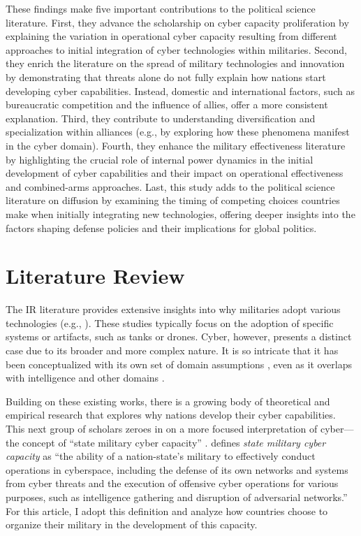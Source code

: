 \documentclass[12pt, letterpaper]{article}
\theoremstyle{plain}
\theoremstyle{remark}
\begin{document}
These findings make five important contributions to the political science literature.
First, they advance the scholarship on cyber capacity proliferation %
by explaining the variation in operational cyber capacity resulting from different approaches to initial integration of cyber technologies within militaries. 
Second, they enrich the literature on the spread of military technologies and innovation by demonstrating that threats alone do not fully explain how nations start developing cyber capabilities. Instead, domestic and international factors, such as bureaucratic competition and the influence of allies, offer a more consistent explanation.
Third, they contribute to understanding diversification and specialization within alliances (e.g., by exploring how these phenomena manifest in the cyber domain).
Fourth, they enhance the military effectiveness literature by highlighting the crucial role of internal power dynamics in the initial development of cyber capabilities and their impact on operational effectiveness and combined-arms approaches.
Last, this study adds to the political science literature on diffusion by examining the timing of competing choices countries make when initially integrating new technologies, offering deeper insights into the factors shaping defense policies and their implications for global politics. 


\section*{Literature Review}


\noindent
The IR literature provides extensive insights into why militaries adopt various technologies (e.g., \citet{most1989logic, jo2007determinants, Horowitz2010PUP, Fuhrmann2017, Kahn2022JCR, Gannon2021use}). These studies typically focus on the adoption of specific systems or artifacts, such as tanks or drones. Cyber, however, presents a distinct case due to its broader and more complex nature. It is so intricate that it has been conceptualized with its own set of domain assumptions \citep{Lupovici2016, Branch2021IO}, even as it overlaps with intelligence and other domains \citep{lindsay2021cyber}.


Building on these existing works, there is a growing body of theoretical and empirical research that explores why nations develop their cyber capabilities. This next group of scholars zeroes in on a more focused interpretation of cyber---the concept of ``state military cyber capacity'' \citep{gomez2016arming, valeriano2018cyber, Kostyuk2021ISQ, Kostyuk2024JPR}. \citet[46]{Kostyuk2024JPR} defines \textit{state military cyber capacity} as ``the ability of a nation-state’s military to effectively conduct operations in cyberspace, including the defense of its own networks and systems from cyber threats and the execution of offensive cyber operations for various purposes, such as intelligence gathering and disruption of adversarial networks.'' For this article, I adopt this definition and analyze how countries choose to organize their military in the development of this capacity.
\end{document}

